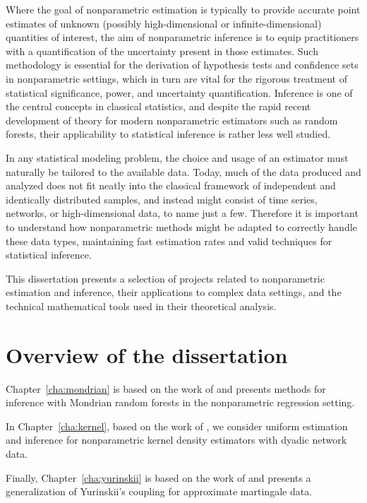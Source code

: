 Where the goal of nonparametric estimation is typically to provide accurate
point estimates of unknown (possibly high-dimensional or infinite-dimensional)
quantities of interest, the aim of nonparametric inference is to equip
practitioners with a quantification of the uncertainty
present in those estimates. Such methodology is essential for the derivation
of hypothesis tests and confidence sets in nonparametric settings,
which in turn are vital for the rigorous treatment of statistical significance,
power, and uncertainty quantification.
Inference is one of the central concepts
in classical statistics, and despite the rapid recent development of
theory for modern nonparametric estimators such as random forests, their
applicability to statistical inference is rather less well studied.

In any statistical modeling problem, the choice and usage of an estimator
must naturally be tailored to the available data.
Today, much of the data produced and analyzed does not fit neatly into the
classical framework of independent and identically distributed samples,
and instead might consist of time series, networks, or
high-dimensional data, to name just a few.
Therefore it is important to understand how
nonparametric methods might be adapted to correctly handle
these data types, maintaining fast estimation
rates and valid techniques for statistical inference.

This dissertation presents a selection of projects related to nonparametric
estimation and inference, their applications to complex data settings,
and the technical mathematical tools used in their theoretical analysis.

\section*{Overview of the dissertation}

Chapter~\ref{cha:mondrian}
is based on the work of \cite{cattaneo2023inference}
and presents methods for inference with Mondrian random forests
in the nonparametric regression setting.

In Chapter~\ref{cha:kernel},
based on the work of \cite{cattaneo2024uniform},
we consider uniform estimation and inference
for nonparametric kernel density estimators with dyadic
network data.

Finally, Chapter~\ref{cha:yurinskii}
is based on the work of
\cite{cattaneo2022yurinskii}
and presents a generalization of Yurinskii's coupling
for approximate martingale data.
